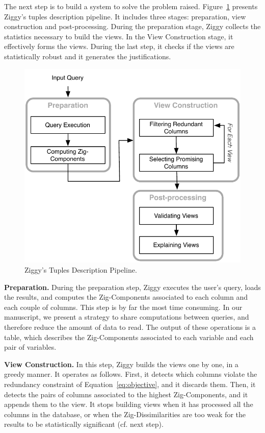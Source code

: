 The next step is to build a system to solve the problem raised.
Figure~\ref{fig:architecture} presents Ziggy's tuples description pipeline.  It
includes three stages: preparation, view construction and post-processing.
During the preparation stage, Ziggy collects the statistics necessary to build
the views. In the View Construction stage, it effectively forms the views.
During the last step, it checks if the views are statistically robust and it
generates the justifications.
\begin{figure}[t!]
    \centering
    \includegraphics[width=\columnwidth]{Images/Algorithm}
    \caption{Ziggy's Tuples Description Pipeline.}
    \label{fig:architecture}
\end{figure}

\vfill
\textbf{Preparation.} During the preparation step, Ziggy executes the user's
query, loads the results, and computes the Zig-Components associated to each
column and each couple of columns. This step is by far the most time consuming.
In our manuscript, we present a strategy to share computations between queries,
and therefore reduce the amount of data to read. The output of these operations
is a table, which describes the Zig-Components associated to each variable and
each pair of variables.

\vfill
\textbf{View Construction.} In this step, Ziggy builds the views one by one, in
a greedy manner. It operates as follows. First, it detects which columns
violate the redundancy constraint of Equation~\ref{eq:objective}, and it
discards them. Then, it detects the pairs of columns associated to the highest
Zig-Components, and it appends them to the view. It stops building views when
it has processed all the columns in the database, or when the
Zig-Dissimilarities are too weak for the results to be statistically
significant (cf.  next step).

